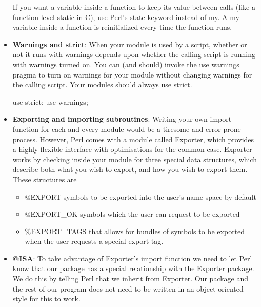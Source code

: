 \documentclass{report}
\begin{document}
\begin{itemize}
            \bigbreak \noindent 
            If you want a variable inside a function to keep its value between calls (like a function-level static in C), use Perl's state keyword instead of my. A my variable inside a function is reinitialized every time the function runs.
        \item \textbf{Warnings and strict}: When your module is used by a script, whether or not it runs with warnings depends upon whether the calling script is running with warnings turned on. You can (and should) invoke the use warnings pragma to turn on warnings for your module without changing warnings for the calling script.
            \bigbreak \noindent 
            Your modules should always use strict.
            \bigbreak \noindent 
            \begin{perlcode}
            use strict;
            use warnings;
            \end{perlcode}
        \item \textbf{Exporting and importing subroutines}: 
            Writing your own import function for each and every module would be a tiresome and error-prone process. However, Perl comes with a module called Exporter, which provides a highly flexible interface with optimisations for the common case.
            \bigbreak \noindent 
            Exporter works by checking inside your module for three special data structures, which describe both what you wish to export, and how you wish to export them. These structures are
            \begin{itemize}
                \item @EXPORT symbols to be exported into the user’s name space by default
                \item @EXPORT\_OK symbols which the user can request to be exported
                \item \%EXPORT\_TAGS that allows for bundles of symbols to be exported when the user requests a special export tag.
            \end{itemize}
        \item \textbf{@ISA}: To take advantage of Exporter’s import function we need to let Perl know that our package has a special relationship with the Exporter package. We do this by telling Perl that we inherit from Exporter. Our package and the rest of our program does not need to be written in an object oriented style for this to work.
            \bigbreak \noindent 

\end{itemize}
\end{document}
